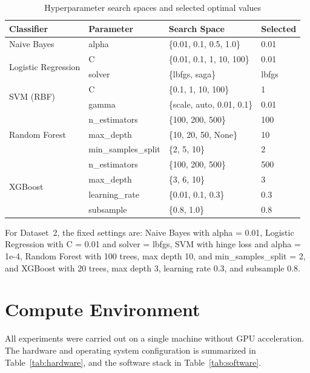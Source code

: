 \begin{table}[H]
\centering
\caption{Hyperparameter search spaces and selected optimal values}
\label{tab:hyperparameters}
\small
\begin{tabular}{@{}llll@{}}
\toprule
\textbf{Classifier} & \textbf{Parameter} & \textbf{Search Space} & \textbf{Selected} \\
\midrule
Naive Bayes & alpha & \{0.01, 0.1, 0.5, 1.0\} & 0.01 \\
\midrule
\multirow{2}{*}{Logistic Regression} & C & \{0.01, 0.1, 1, 10, 100\} & 0.01 \\
& solver & \{lbfgs, saga\} & lbfgs \\
\midrule
\multirow{2}{*}{SVM (RBF)} & C & \{0.1, 1, 10, 100\} & 1 \\
& gamma & \{scale, auto, 0.01, 0.1\} & 0.01 \\
\midrule
\multirow{3}{*}{Random Forest} & n\_estimators & \{100, 200, 500\} & 100 \\
& max\_depth & \{10, 20, 50, None\} & 10 \\
& min\_samples\_split & \{2, 5, 10\} & 2 \\
\midrule
\multirow{4}{*}{XGBoost} & n\_estimators & \{100, 200, 500\} & 500 \\
& max\_depth & \{3, 6, 10\} & 3 \\
& learning\_rate & \{0.01, 0.1, 0.3\} & 0.3 \\
& subsample & \{0.8, 1.0\} & 0.8 \\
\bottomrule
\end{tabular}
\end{table}

For Dataset~2, the fixed settings are: Naive Bayes with alpha = 0.01, Logistic Regression with C = 0.01 and solver = lbfgs, SVM with hinge loss and alpha = 1e-4, Random Forest with 100 trees, max depth 10, and min_samples_split = 2, and XGBoost with 20 trees, max depth 3, learning rate 0.3, and subsample 0.8.

\section{Compute Environment}
\label{app:software}

All experiments were carried out on a single machine without GPU acceleration. The hardware and operating system configuration is summarized in Table~\ref{tab:hardware}, and the software stack in Table~\ref{tab:software}.

